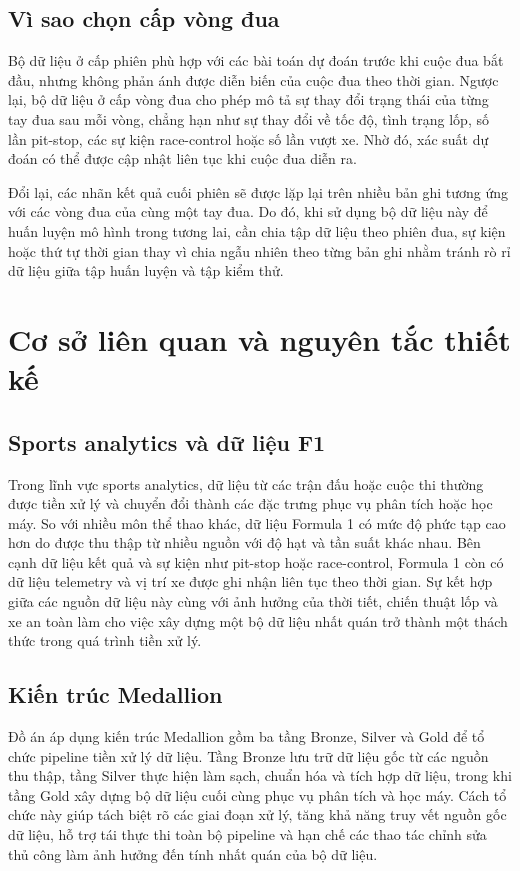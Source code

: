\documentclass[conference]{IEEEtran}
\begin{document}
\subsection{Vì sao chọn cấp vòng đua}

Bộ dữ liệu ở cấp phiên phù hợp với các bài toán dự đoán trước khi cuộc đua bắt đầu, nhưng không phản ánh được diễn biến của cuộc đua theo thời gian. Ngược lại, bộ dữ liệu ở cấp vòng đua cho phép mô tả sự thay đổi trạng thái của từng tay đua sau mỗi vòng, chẳng hạn như sự thay đổi về tốc độ, tình trạng lốp, số lần pit-stop, các sự kiện race-control hoặc số lần vượt xe. Nhờ đó, xác suất dự đoán có thể được cập nhật liên tục khi cuộc đua diễn ra.

Đổi lại, các nhãn kết quả cuối phiên sẽ được lặp lại trên nhiều bản ghi tương ứng với các vòng đua của cùng một tay đua. Do đó, khi sử dụng bộ dữ liệu này để huấn luyện mô hình trong tương lai, cần chia tập dữ liệu theo phiên đua, sự kiện hoặc thứ tự thời gian thay vì chia ngẫu nhiên theo từng bản ghi nhằm tránh rò rỉ dữ liệu giữa tập huấn luyện và tập kiểm thử.

\section{Cơ sở liên quan và nguyên tắc thiết kế}
\subsection{Sports analytics và dữ liệu F1}
Trong lĩnh vực sports analytics, dữ liệu từ các trận đấu hoặc cuộc thi thường được tiền xử lý và chuyển đổi thành các đặc trưng phục vụ phân tích hoặc học máy. So với nhiều môn thể thao khác, dữ liệu Formula 1 có mức độ phức tạp cao hơn do được thu thập từ nhiều nguồn với độ hạt và tần suất khác nhau. Bên cạnh dữ liệu kết quả và sự kiện như pit-stop hoặc race-control, Formula 1 còn có dữ liệu telemetry và vị trí xe được ghi nhận liên tục theo thời gian. Sự kết hợp giữa các nguồn dữ liệu này cùng với ảnh hưởng của thời tiết, chiến thuật lốp và xe an toàn làm cho việc xây dựng một bộ dữ liệu nhất quán trở thành một thách thức trong quá trình tiền xử lý.

\subsection{Kiến trúc Medallion}
Đồ án áp dụng kiến trúc Medallion gồm ba tầng Bronze, Silver và Gold để tổ chức pipeline tiền xử lý dữ liệu. Tầng Bronze lưu trữ dữ liệu gốc từ các nguồn thu thập, tầng Silver thực hiện làm sạch, chuẩn hóa và tích hợp dữ liệu, trong khi tầng Gold xây dựng bộ dữ liệu cuối cùng phục vụ phân tích và học máy. Cách tổ chức này giúp tách biệt rõ các giai đoạn xử lý, tăng khả năng truy vết nguồn gốc dữ liệu, hỗ trợ tái thực thi toàn bộ pipeline và hạn chế các thao tác chỉnh sửa thủ công làm ảnh hưởng đến tính nhất quán của bộ dữ liệu.
\end{document}
